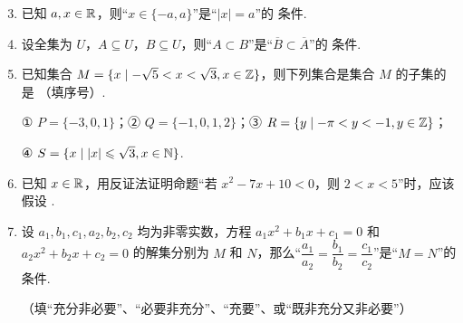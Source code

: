 \documentclass[a4paper,11pt]{article}
\begin{document}


\begin{enumerate}
\setcounter{enumi}{2}

\item 已知 $a,x\in\mathbb{R}$，则“$x\in\{-a,a\}$”是“$|x|=a$”的 \blankline[4.4em] 条件.


\item 设全集为 $U$，$A\subseteq U$，$B\subseteq U$，则“$A\subset B$”是“$\overline{B}\subset\overline{A}$”的 \blankline[4.4em] 条件.


\item 已知集合 $M=\{x\mid -\sqrt{5}<x<\sqrt{3},x\in\mathbb{Z}\}$，则下列集合是集合 $M$ 的子集的是 \blankline[4.4em]（填序号）.

① $P=\{-3,0,1\}$；② $Q=\{-1,0,1,2\}$；③ $R=\{y\mid -\pi<y<-1,y\in\mathbb{Z}\}$；

④ $S=\{x\mid |x|\leqslant\sqrt{3},x\in\mathbb{N}\}$.


\ifanswer
\solbegin
{}
\solend

\fi

\item 已知 $x\in\mathbb{R}$，用反证法证明命题“若 $x^2-7x+10<0$，则 $2<x<5$”时，应该假设 \blankline[5em].


\item 设 $a_1,b_1,c_1,a_2,b_2,c_2$ 均为非零实数，方程 $a_1x^2+b_1x+c_1=0$ 和 $a_2x^2+b_2x+c_2=0$ 的解集分别为 $M$ 和 $N$，那么“$\dfrac{a_1}{a_2}=\dfrac{b_1}{b_2}=\dfrac{c_1}{c_2}$”是“$M=N$”的 \blankline[4.4em] 条件.

（填“充分非必要”、“必要非充分”、“充要”、或“既非充分又非必要”）


\ifanswer
\solbegin
{}
\solend


\end{enumerate}
\end{document}
